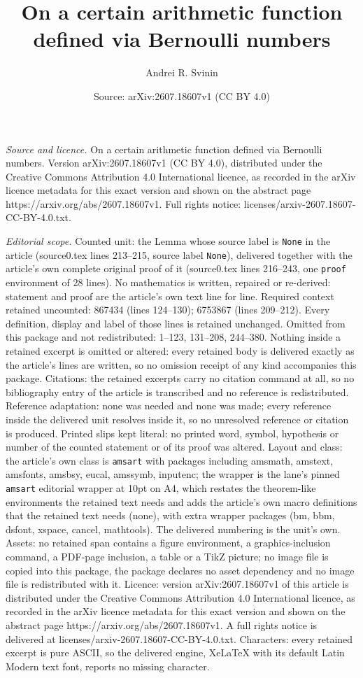 \documentclass[10pt,a4paper]{amsart}
\title[On a certain arithmetic function defined via Bernoulli numbe]{On a certain arithmetic function defined via Bernoulli numbers}
\author{Andrei R. Svinin}
\date{Source: arXiv:2607.18607v1 (CC BY 4.0)}
\begin{document}
\maketitle

\noindent\emph{Source and licence.} On a certain arithmetic function defined via Bernoulli numbers. Version arXiv:2607.18607v1 (CC BY 4.0), distributed under the Creative Commons Attribution 4.0 International licence, as recorded in the arXiv licence metadata for this exact version and shown on the abstract page https://arxiv.org/abs/2607.18607v1. Full rights notice: licenses/arxiv-2607.18607-CC-BY-4.0.txt.\par\smallskip

\noindent\textit{Editorial scope.} Counted unit: the Lemma whose source label is \texttt{None} in the article (source0.tex lines 213--215, source label \texttt{None}), delivered together with the article's own complete original proof of it (source0.tex lines 216--243, one \texttt{proof} environment of 28 lines). No mathematics is written, repaired or re-derived: statement and proof are the article's own text line for line. Required context retained uncounted: 867434 (lines 124--130); 6753867 (lines 209--212). Every definition, display and label of those lines is retained unchanged. Omitted from this package and not redistributed: 1--123, 131--208, 244--380. Nothing inside a retained excerpt is omitted or altered: every retained body is delivered exactly as the article's lines are written, so no omission receipt of any kind accompanies this package. Citations: the retained excerpts carry no citation command at all, so no bibliography entry of the article is transcribed and no reference is redistributed. Reference adaptation: none was needed and none was made; every reference inside the delivered unit resolves inside it, so no unresolved reference or citation is produced. Printed slips kept literal: no printed word, symbol, hypothesis or number of the counted statement or of its proof was altered. Layout and class: the article's own class is \texttt{amsart} with packages including amsmath, amstext, amsfonts, amsbsy, eucal, amssymb, inputenc; the wrapper is the lane's pinned \texttt{amsart} editorial wrapper at 10pt on A4, which restates the theorem-like environments the retained text needs and adds the article's own macro definitions that the retained text needs (none), with extra wrapper packages (bm, bbm, dsfont, xspace, cancel, mathtools). The delivered numbering is the unit's own. Assets: no retained span contains a figure environment, a graphics-inclusion command, a PDF-page inclusion, a table or a TikZ picture; no image file is copied into this package, the package declares no asset dependency and no image file is redistributed with it. Licence: version arXiv:2607.18607v1 of this article is distributed under the Creative Commons Attribution 4.0 International licence, as recorded in the arXiv licence metadata for this exact version and shown on the abstract page https://arxiv.org/abs/2607.18607v1. A full rights notice is delivered at licenses/arxiv-2607.18607-CC-BY-4.0.txt. Characters: every retained excerpt is pure ASCII, so the delivered engine, XeLaTeX with its default Latin Modern text font, reports no missing character.
\end{document}

